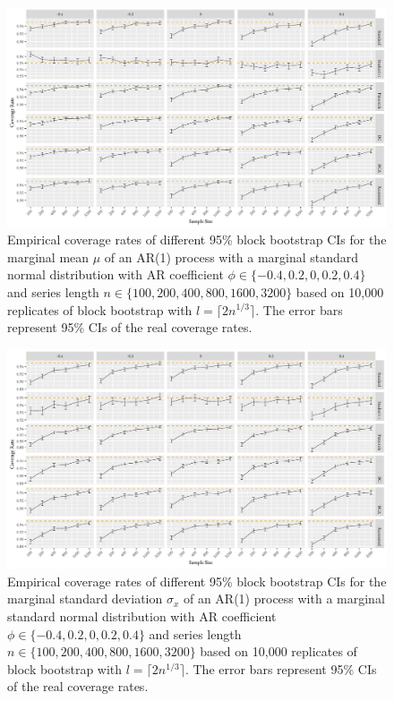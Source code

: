 \documentclass[10pt]{article}
\begin{document}
\begin{figure}[tbp]
  \centering
  \includegraphics[width=\textwidth]{figures/plot_norm_mu_2}
  \caption{Empirical coverage rates of different 95\% block bootstrap CIs for
    the marginal mean $\mu$ of an AR(1) process with a marginal standard 
    normal distribution with AR coefficient
    $\phi \in \{-0.4, 0.2, 0, 0.2, 0.4\}$ and series length
    $n \in \{100, 200, 400, 800, 1600, 3200\}$ based on 10,000 replicates of
    block bootstrap with $l = \lceil 2n^{1/3} \rceil$. The
    error bars represent 95\% CIs of the real coverage rates.}
  \label{fig:mu2}
\end{figure}


\begin{figure}[bp]
  \centering
  \includegraphics[width=\textwidth]{figures/plot_norm_sigma_2}
  \caption{Empirical coverage rates of different 95\% block bootstrap CIs for
    the marginal standard deviation $\sigma_x$ of an AR(1) process with a
    marginal standard normal distribution with AR 
    coefficient $\phi \in \{-0.4, 0.2, 0, 0.2, 0.4\}$ and series length 
    $n \in \{100, 200, 400, 800, 1600, 3200\}$ based on 10,000 replicates of
    block bootstrap with $l = \lceil 2n^{1/3} \rceil$. The 
    error bars represent 95\% CIs of the real coverage rates.}
  \label{fig:sigma2}
\end{figure}
\end{document}
